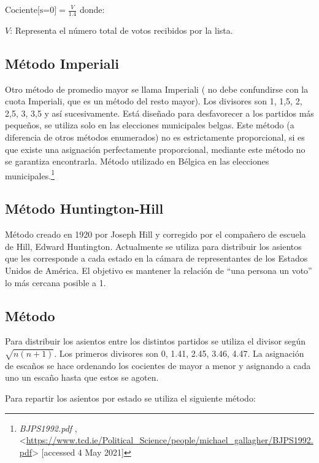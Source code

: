 \documentclass[12pt,a4paper,]{book}
\let\rmarkdownfootnote\footnote%
\def\footnote{\protect\rmarkdownfootnote}
\numberwithin{dummy}{section}
\theoremstyle{ocrenumbox}
\theoremstyle{blacknumex}
\theoremstyle{blacknumbox}
\theoremstyle{ocrenum}
\theoremstyle{ocrenum}
\begin{document}
\(\textrm{Cociente[s=0]} = \frac{V}{1.4}\) donde:

\(V\): Representa el número total de votos recibidos por la lista.

\hypertarget{muxe9todo-imperiali}{%
\subsection{Método Imperiali}\label{muxe9todo-imperiali}}

Otro método de promedio mayor se llama Imperiali ( no debe confundirse
con la cuota Imperiali, que es un método del resto mayor). Los divisores
son 1, 1,5, 2, 2,5, 3, 3,5 y así sucesivamente. Está diseñado para
desfavorecer a los partidos más pequeños, se utiliza solo en las
elecciones municipales belgas. Este método (a diferencia de otros
métodos enumerados) no es estrictamente proporcional, si es que existe
una asignación perfectamente proporcional, mediante este método no se
garantiza encontrarla. Método utilizado en Bélgica en las elecciones
municipales.\footnote{\emph{BJPS1992.pdf} ,
  \textless{}\url{https://www.tcd.ie/Political_Science/people/michael_gallagher/BJPS1992.pdf}\textgreater{}
  {[}accessed 4 May 2021{]}}

\hypertarget{muxe9todo-huntington-hill}{%
\subsection{Método Huntington-Hill}\label{muxe9todo-huntington-hill}}

Método creado en 1920 por Joseph Hill y corregido por el compañero de
escuela de Hill, Edward Huntington. Actualmente se utiliza para
distribuir los asientos que les corresponde a cada estado en la cámara
de representantes de los Estados Unidos de América. El objetivo es
mantener la relación de ``una persona un voto'' lo más cercana posible a
1.

\hypertarget{muxe9todo}{%
\subsection{Método}\label{muxe9todo}}

Para distribuir los asientos entre los distintos partidos se utiliza el
divisor según \(\sqrt{n(n+1)}\). Los primeros divisores son 0, 1.41,
2.45, 3.46, 4.47. La asignación de escaños se hace ordenando los
cocientes de mayor a menor y asignando a cada uno un escaño hasta que
estos se agoten.

Para repartir los asientos por estado se utiliza el siguiente método:
\end{document}

